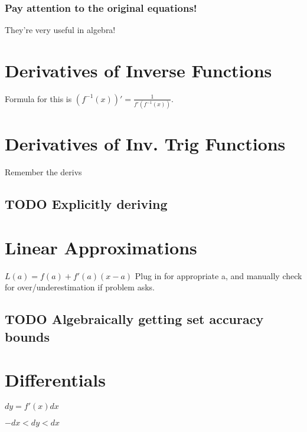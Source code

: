 \documentclass[letterpaper]{article}
\begin{document}
\subsubsection{Pay attention to the original equations!}
\label{sec:org7f36a20}
They're very useful in algebra!

\section{Derivatives of Inverse Functions}
\label{sec:org55b064a}
Formula for this is \((f^{-1}(x))' = \frac{1}{f'(f^{-1}(x))}\). 

\section{Derivatives of Inv. Trig Functions}
\label{sec:orgcc24408}
Remember the derivs

\subsection{{\bfseries\sffamily TODO} Explicitly deriving}
\label{sec:org4731400}

\section{Linear Approximations}
\label{sec:org8b50f52}
\(L(a) = f(a) + f'(a)(x-a)\)
Plug in for appropriate a, and manually check for over/underestimation if problem asks.

\subsection{{\bfseries\sffamily TODO} Algebraically getting set accuracy bounds}
\label{sec:org4dfb027}

\section{Differentials}
\label{sec:org5ec2d27}
\(dy = f'(x)dx\)

\(-dx < dy < dx\)
\end{document}
